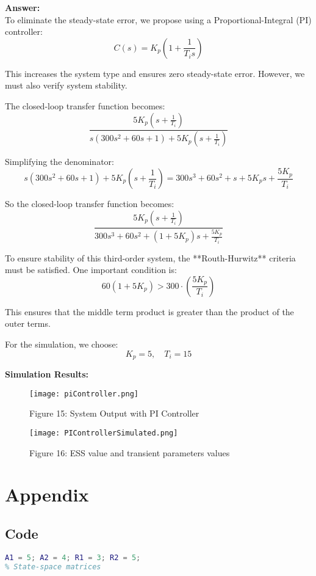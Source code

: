 \documentclass{report}
\begin{document}
\begin{flushleft}
\textbf{Answer:} \\

To eliminate the steady-state error, we propose using a Proportional-Integral (PI) controller:
\[
C(s) = K_p \left(1 + \frac{1}{T_i s} \right)
\]

This increases the system type and ensures zero steady-state error. However, we must also verify system stability.

The closed-loop transfer function becomes:
\[
\frac{5K_p(s + \frac{1}{T_i})}{s(300s^2 + 60s + 1) + 5K_p(s + \frac{1}{T_i})}
\]

Simplifying the denominator:
\[
s(300s^2 + 60s + 1) + 5K_p\left(s + \frac{1}{T_i}\right) = 300s^3 + 60s^2 + s + 5K_p s + \frac{5K_p}{T_i}
\]

So the closed-loop transfer function becomes:
\[
\frac{5K_p(s + \frac{1}{T_i})}{300s^3 + 60s^2 + (1 + 5K_p)s + \frac{5K_p}{T_i}}
\]

To ensure stability of this third-order system, the **Routh-Hurwitz** criteria must be satisfied. One important condition is:
\[
60(1 + 5K_p) > 300 \cdot \left(\frac{5K_p}{T_i}\right)
\]

This ensures that the middle term product is greater than the product of the outer terms.

For the simulation, we choose:
\[
K_p = 5, \quad T_i = 15
\]

\textbf{Simulation Results:}

\vspace{0.5em}

\begin{figure}[h!]
\centering
\begin{minipage}{0.48\textwidth}
  \centering
  \texttt{[image: piController.png]}
  \caption*{Figure 15: System Output with PI Controller}
\end{minipage}\hfill
\begin{minipage}{0.48\textwidth}
  \centering
  \texttt{[image: PIControllerSimulated.png]}
  \caption*{Figure 16: ESS value and transient parameters values}
\end{minipage}
\end{figure}


\appendix
\chapter{Appendix}
\section{Code}
\begin{lstlisting}[language=Matlab, caption=project code,label=lst:code]
A1 = 5; A2 = 4; R1 = 3; R2 = 5;
% State-space matrices


\end{lstlisting}
\end{flushleft}
\end{document}
